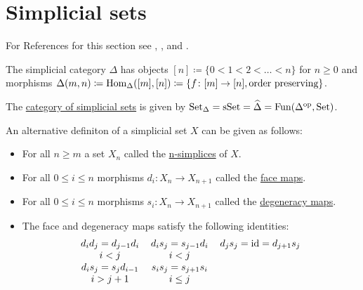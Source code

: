 \section{Simplicial sets}

For References for this section see \cite[Section 1.2]{Cisinski_2019}, \cite[Section 1.1]{kerodon}, \cite{Riehl2011ALI} and \cite[Section I.1]{GoerSimp1999}.

\begin{defi}
    The simplicial category $\Delta$ has objects $[n] \coloneqq \{ 0<1<2< \dotsc <n\}$ for $n \geq 0$ and morphisms $\Delta(m,n)\coloneqq \operatorname{Hom}_{\Delta}([m],[n]) \coloneqq \{ f \colon[m] \to [n], \text{order preserving} \}$.
\end{defi}

\begin{defi}
    The \underline{category of simplicial sets} is given by $\operatorname{Set}_{\Delta}=\operatorname{sSet}=\widehat{\Delta}= \operatorname{Fun}(\Delta^{\operatorname{op}},\operatorname{Set})$.
\end{defi}

\begin{rmk}
    An alternative definiton of a simplicial set $X$ can be given as follows:
    \begin{itemize}
        \item 
            For all $n\geq m$ a set $X_n$ called the \underline{n-simplices} of $X$.
        \item 
            For all $0 \leq i \leq n$ morphisms $d_i\colon X_n \to X_{n+1}$ called the \underline{face maps}.
        \item 
            For all $0 \leq i \leq n$ morphisms $s_i \colon X_n \to X_{n+1}$
            called the \underline{degeneracy maps}.
        \item 
            The face and degeneracy maps satisfy the following identities:
            \[
            \begin{tabular}{ccc}
                 $d_id_j=d_{j-1}d_i$ & $d_is_j=s_{j-1}d_i$ & $d_js_j=\id=d_{j+1}s_j$  
                 \\
                 $i<j$ & $i<j$ & 
                 \\
                 $d_is_j=s_jd_{i-1}$ & $s_is_j=s_{j+1}s_i$
                 \\
                 $i>j+1$ & $i \leq j$
            \end{tabular}
            \]
    \end{itemize}
\end{rmk}

